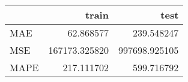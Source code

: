 \begin{tabular}{lrr}
\toprule
{} &          train &           test \\
\midrule
MAE  &      62.868577 &     239.548247 \\
MSE  &  167173.325820 &  997698.925105 \\
MAPE &     217.111702 &     599.716792 \\
\bottomrule
\end{tabular}
